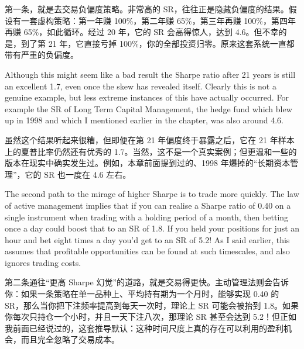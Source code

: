 \begin{chineseblock}第一条，就是去交易负偏度策略。非常高的 SR，往往正是隐藏负偏度的结果。假设有一套虚构策略：第一年赚 100\%，第二年赚 65\%，第三年再赚 100\%，第四年再赚 65\%，如此循环。经过 20 年，它的 SR 会高得惊人，达到 4.6。但不幸的是，到了第 21 年，它直接亏掉 100\%，你的全部投资归零。原来这套系统一直都带有严重的负偏度。\end{chineseblock}

\bipairgap

\begin{englishblock} Although this might seem like a bad result the Sharpe ratio after 21 years is still an excellent 1.7, even once the skew has revealed itself. Clearly this is not a genuine example, but less extreme instances of this have actually occurred. For example the SR of Long Term Capital Management, the hedge fund which blew up in 1998 and which I mentioned earlier in the chapter, was also around 4.6. \end{englishblock}

\begin{chineseblock}虽然这个结果听起来很糟，但即便在第 21 年偏度终于暴露之后，它在 21 年样本上的夏普比率仍然还有优秀的 1.7。当然，这不是一个真实案例；但更温和一些的版本在现实中确实发生过。例如，本章前面提到过的、1998 年爆掉的“长期资本管理”，它的 SR 也一度在 4.6 左右。\end{chineseblock}

\bipairgap

\begin{englishblock} The second path to the mirage of higher Sharpe is to trade more quickly. The law of active management implies that if you can realise a Sharpe ratio of 0.40 on a single instrument when trading with a holding period of a month, then betting once a day could boost that to an SR of 1.8. If you held your positions for just an hour and bet eight times a day you'd get to an SR of 5.2! As I said earlier, this assumes that profitable opportunities can be found at such timescales, and also ignores trading costs. \end{englishblock}

\begin{chineseblock}第二条通往“更高 Sharpe 幻觉”的道路，就是交易得更快。主动管理法则会告诉你：如果一条策略在单一品种上、平均持有期为一个月时，能够实现 0.40 的 SR，那么当你把下注频率提高到每天一次时，理论上 SR 可能会被抬到 1.8。如果你每次只持仓一个小时，并且一天下注八次，那理论 SR 甚至会达到 5.2！但正如我前面已经说过的，这套推导默认：这种时间尺度上真的存在可以利用的盈利机会，而且完全忽略了交易成本。\end{chineseblock}

